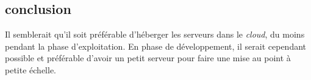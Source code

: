     \subsection{conclusion}
    Il semblerait qu'il soit préférable d'héberger les serveurs dans le \textsl{cloud}, 
    du moins pendant la phase d'exploitation. En phase de développement,
    il serait cependant possible et préférable d'avoir un petit serveur pour faire une
    mise au point à petite échelle.
%
\vfill
\pagebreak
